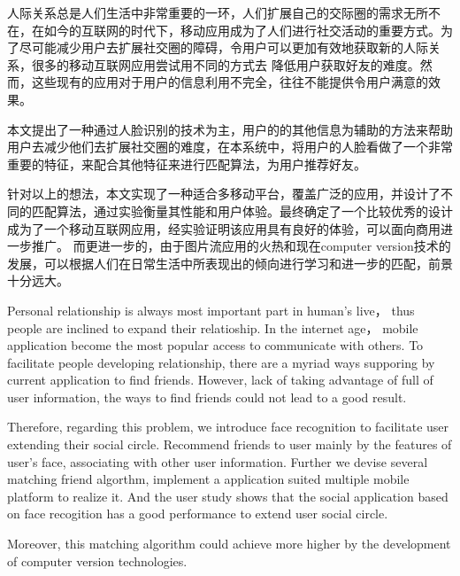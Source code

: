 
\begin{cabstract}
	人际关系总是人们生活中非常重要的一环，⼈们扩展自己的交际圈的需求⽆所不在，在如今的互联网的时代下，移动应用成为了人们进行社交活动的重要方式。为了尽可能减少用户去扩展社交圈的障碍，令⽤户可以更加有效地获取新的人际关系，很多的移动互联⽹应用尝试用不同的方式去 降低用户获取好友的难度。然⽽，这些现有的应用对于用户的信息利用不完全，往往不能提供令用户满意的效果。

	本⽂提出了⼀种通过人脸识别的技术为主，用户的的其他信息为辅助的方法来帮助用户去减少他们去扩展社交圈的难度，在本系统中，将用户的人脸看做了一个非常重要的特征，来配合其他特征来进行匹配算法，为用户推荐好友。 

针对以上的想法，本⽂实现了一种适合多移动平台，覆盖广泛的应用，并设计了不同的匹配算法，通过实验衡量其性能和用户体验。最终确定了一个比较优秀的设计 成为了一个移动互联⽹应⽤，经实验证明该应用具有良好的体验，可以面向商⽤进⼀步推⼴。
而更进一步的，由于图片流应用的火热和现在computer version技术的发展，可以根据人们在日常生活中所表现出的倾向进行学习和进一步的匹配，前景十分远大。


\end{cabstract}

\begin{eabstract}
	Personal relationship is always most important part in human's live， thus people are inclined to expand their relatioship. In the internet age， mobile application become the most popular access to communicate with others. To facilitate people developing relationship, there are a myriad ways supporing by current application to find friends. 
	However, lack of taking advantage of full of user information, the ways to find friends could not lead to a good result.

	Therefore, regarding this problem, we introduce face recognition to facilitate user extending their social circle. Recommend friends to user mainly by the features of user's face, associating with other user information. Further we devise several matching friend algorthm, implement a application suited multiple mobile platform to realize it. And the user study shows that the social application based on face recogition has a good performance to extend user social circle. 

	Moreover, this matching algorithm could achieve more higher by the development of computer version technologies.   
\end{eabstract}

